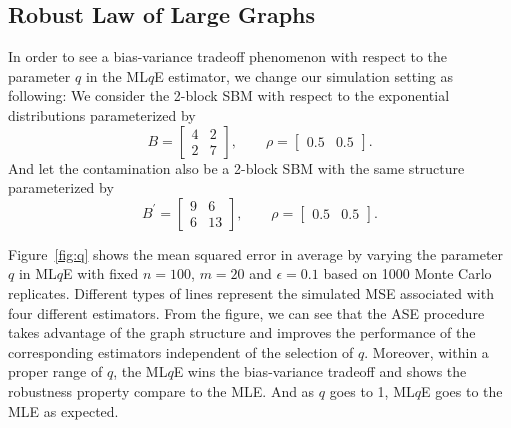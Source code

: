 \documentclass[simplex.tex]{subfiles}
\begin{document}
\subsection{Robust Law of Large Graphs}

In order to see a bias-variance tradeoff phenomenon with respect to the parameter $q$ in the ML$q$E estimator, we change our simulation setting as following:
We consider the 2-block SBM with respect to the exponential distributions parameterized by
\begin{equation*}
B = \begin{bmatrix}
4 & 2 \\
2 & 7
\end{bmatrix}
,\qquad \rho = \begin{bmatrix}
0.5 & 0.5
\end{bmatrix}.
\end{equation*}
And let the contamination also be a 2-block SBM with the same structure parameterized by
\begin{equation*}
B^{\prime} = \begin{bmatrix}
9 & 6 \\
6 & 13
\end{bmatrix}
,\qquad \rho = \begin{bmatrix}
0.5 & 0.5
\end{bmatrix}.
\end{equation*}

Figure~\ref{fig:q} shows the mean squared error in average by varying the parameter $q$ in ML$q$E with fixed $n = 100$, $m = 20$ and $\epsilon = 0.1$ based on 1000 Monte Carlo replicates. Different types of lines represent the simulated MSE associated with four different estimators. From the figure, we can see that the ASE procedure takes advantage of the graph structure and improves the performance of the corresponding estimators independent of the selection of $q$. Moreover, within a proper range of $q$, the ML$q$E wins the bias-variance tradeoff and shows the robustness property compare to the MLE. And as $q$ goes to 1, ML$q$E goes to the MLE as expected.
\end{document}
